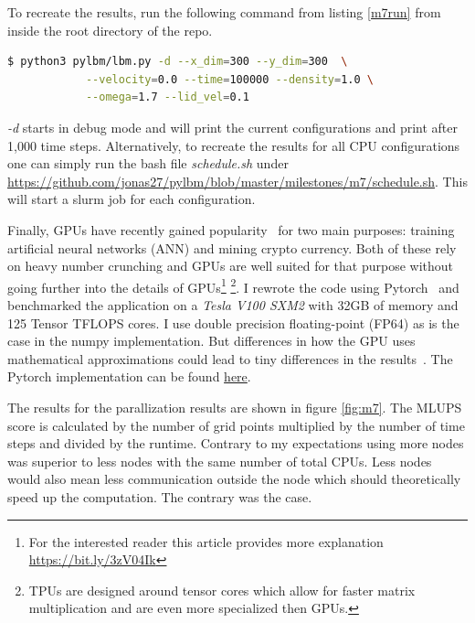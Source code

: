 To recreate the results, run the following command from listing \ref{m7run} from inside the root directory of the repo.
\begin{lstlisting}[language=bash, label=m7run, caption=Run lbm with extra arguments.]
  $ python3 pylbm/lbm.py -d --x_dim=300 --y_dim=300  \
            --velocity=0.0 --time=100000 --density=1.0 \
            --omega=1.7 --lid_vel=0.1
\end{lstlisting}
\textit{-d} starts in debug mode and will print the current configurations and print after 1,000 time steps.
Alternatively, to recreate the results for all CPU configurations one can simply run the bash file \textit{schedule.sh} under \url{https://github.com/jonas27/pylbm/blob/master/milestones/m7/schedule.sh}.
This will start a slurm job for each configuration.

Finally, GPUs have recently gained popularity~\cite{boyer2013gpu-pop} for two main purposes: training artificial neural networks (ANN) and mining crypto currency. 
Both of these rely on heavy number crunching and GPUs are well suited for that purpose without going further into the details of GPUs\footnote{For the interested reader this article provides more explanation \url{https://bit.ly/3zV04Ik}}
\footnote{TPUs are designed around tensor cores which allow for faster matrix multiplication and are even more specialized then GPUs.}.
I rewrote the code using Pytorch~\cite{pytorch} and benchmarked the application on a \textit{Tesla V100 SXM2} with 32GB of memory and 125 Tensor TFLOPS cores.
I use double precision floating-point (FP64) as is the case in the numpy implementation.
But differences in how the GPU uses mathematical approximations could lead to tiny differences in the results~\cite{precision-nvidia}.
The Pytorch implementation can be found \href{https://github.com/jonas27/pylbm/blob/master/pylbm/torchlbm/lbm.py}{here}.


The results for the parallization results are shown in figure \ref{fig:m7}.
The MLUPS score is calculated by the number of grid points multiplied by the number of time steps and divided by the runtime.
Contrary to my expectations using more nodes was superior to less nodes with the same number of total CPUs. 
Less nodes would also mean less communication outside the node which should theoretically speed up the computation. The contrary was the case.

